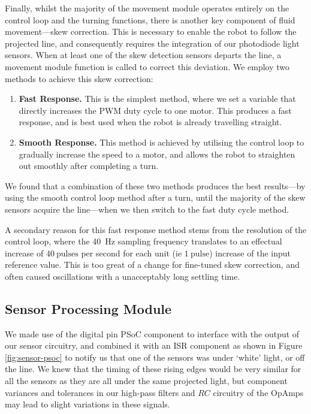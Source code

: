 \documentclass[conference]{IEEEtran}
\begin{document}
Finally, whilst the majority of the movement module operates entirely on the control loop and the turning functions, there is another key component of fluid movement—skew correction.
This is necessary to enable the robot to follow the projected line, and consequently requires the integration of our photodiode light sensors.
When at least one of the skew detection sensors departs the line, a movement module function is called to correct this deviation.
We employ two methods to achieve this skew correction:
\begin{enumerate}
	\item \textbf{Fast Response.}
	      This is the simplest method, where we set a variable that directly increases the PWM duty cycle to one motor.
	      This produces a fast response, and is best used when the robot is already travelling straight.
	\item \textbf{Smooth Response.}
	      This method is achieved by utilising the control loop to gradually increase the speed to a motor, and allows the robot to straighten out smoothly after completing a turn.
\end{enumerate}
We found that a combination of these two methods produces the best results—by using the smooth control loop method after a turn, until the majority of the skew sensors acquire the line—when we then switch to the fast duty cycle method.

A secondary reason for this fast response method stems from the resolution of the control loop, where the \qty{40}{\hertz} sampling frequency translates to an effectual increase of $\qty{40}{\text{pulses}}$ per second for each unit (ie $\qty{1}{\text{pulse}}$) increase of the input reference value.
This is too great of a change for fine-tuned skew correction, and often caused oscillations with a unacceptably long settling time.

\subsection{Sensor Processing Module}

We made use of the digital pin PSoC component to interface with the output of our sensor circuitry, and combined it with an ISR component as shown in Figure \ref{fig:sensor-psoc} to notify us that one of the sensors was under `white' light, or off the line.
We knew that the timing of these rising edges would be very similar for all the sensors as they are all under the same projected light, but component variances and tolerances in our high-pass filters and $RC$ circuitry of the OpAmps may lead to slight variations in these signals.
\end{document}
